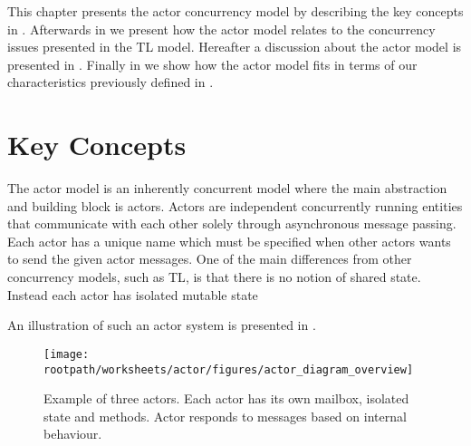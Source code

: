 \makeatletter {}\makeatother
{}
This chapter presents the actor concurrency model by describing the key concepts in . Afterwards in  we present how the actor model relates to the concurrency issues presented in the \ac{TL} model. Hereafter a discussion about the actor model is presented in . Finally in  we show how the actor model fits in terms of our characteristics previously defined in .

\section{Key Concepts}\label{sec:actor_concepts}
The actor model is an inherently concurrent model where the main abstraction and building block is actors. Actors are independent concurrently running entities that communicate with each other solely through asynchronous message passing. Each actor has a unique name which must be specified when other actors wants to send the given actor messages. One of the main differences from other concurrency models, such as \ac{TL}, is that there is no notion of  shared state. Instead each actor has isolated mutable state 



An illustration of such an actor system is presented in .








\begin{figure}[ht!]
\centering
\texttt{[image: \\rootpath/worksheets/actor/figures/actor\_diagram\_overview]}
\caption{Example of three actors. Each actor has its own mailbox, isolated state and methods. Actor responds to messages based on internal behaviour.}\label{fig:actor_overview}
\end{figure}



